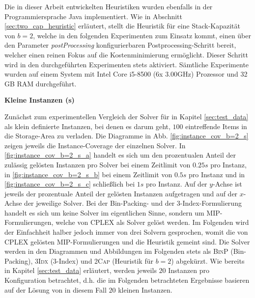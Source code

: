 Die in dieser Arbeit entwickelten Heuristiken wurden ebenfalls in der Programmiersprache Java implementiert.
Wie in Abschnitt \ref{sec:two_cap_heuristic} erläutert, stellt die Heuristik für eine Stack-Kapazität von $b = 2$,
welche in den folgenden Experimenten zum Einsatz kommt, einen über den Parameter \textit{postProcessing} konfigurierbaren
Postprocessing-Schritt bereit, welcher einen reinen Fokus auf die Kostenminimierung ermöglicht. Dieser Schritt wird
in den durchgeführten Experimenten stets aktiviert. Sämtliche Experimente wurden auf einem System mit Intel Core i5-8500 (6x 3.00GHz) Prozessor und 32 GB RAM durchgeführt.

\textbf{Kleine Instanzen (s)}

Zunächst zum experimentellen Vergleich der Solver für in Kapitel \ref{sec:test_data} als klein definierte Instanzen,
bei denen es darum geht, $100$ eintreffende Items in die Storage-Area zu verladen.
Die Diagramme in Abb. \ref{fig:instance_cov_b=2_s} zeigen jeweils die Instance-Coverage der einzelnen Solver.
In \ref{fig:instance_cov_b=2_s_a} handelt es sich um den prozentualen Anteil der zulässig gelösten Instanzen pro Solver bei einem Zeitlimit von $0.25s$ pro Instanz, in \ref{fig:instance_cov_b=2_s_b} bei einem Zeitlimit von $0.5s$ pro Instanz und in \ref{fig:instance_cov_b=2_s_c} schließlich bei $1s$ pro Instanz.\newline
Auf der $y$-Achse ist jeweils der prozentuale Anteil der gelösten Instanzen aufgetragen und auf der $x$-Achse der jeweilige Solver. Bei der Bin-Packing- und der 3-Index-Formulierung handelt es sich um keine Solver im eigentlichen Sinne,
sondern um MIP-Formulierungen, welche von CPLEX als Solver gelöst werden.
Im Folgenden wird der Einfachheit halber jedoch immer von drei Solvern gesprochen, womit die von
CPLEX gelösten MIP-Formulierungen und die Heuristik gemeint sind.
Die Solver werden in den Diagrammen und Abbildungen im Folgenden stets als \textsc{BinP} (Bin-Packing),
\textsc{3Idx} (3-Index) und \textsc{2Cap} (Heuristik für $b = 2$) abgekürzt.
Wie bereits in Kapitel \ref{sec:test_data} erläutert, werden jeweils $20$ Instanzen pro Konfiguration betrachtet,
d.h. die im Folgenden betrachteten Ergebnisse basieren auf der Lösung von in diesem Fall $20$ kleinen Instanzen.

